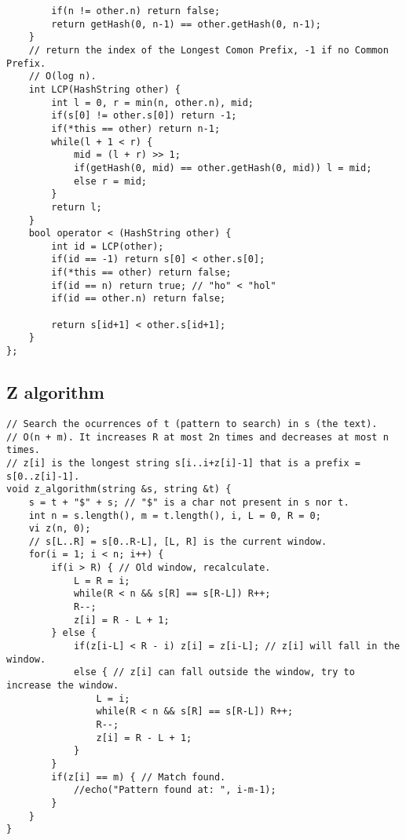 \documentclass[a4paper]{article}
\begin{document}
\begin{multicols}{2}
\begin{verbatim}
        if(n != other.n) return false;
        return getHash(0, n-1) == other.getHash(0, n-1);
    }
    // return the index of the Longest Comon Prefix, -1 if no Common Prefix.
    // O(log n).
    int LCP(HashString other) {
        int l = 0, r = min(n, other.n), mid;
        if(s[0] != other.s[0]) return -1;
        if(*this == other) return n-1;
        while(l + 1 < r) {
            mid = (l + r) >> 1;
            if(getHash(0, mid) == other.getHash(0, mid)) l = mid;
            else r = mid;
        }
        return l;
    }
    bool operator < (HashString other) {
        int id = LCP(other);
        if(id == -1) return s[0] < other.s[0];
        if(*this == other) return false;
        if(id == n) return true; // "ho" < "hol"
        if(id == other.n) return false;

        return s[id+1] < other.s[id+1];
    }
};
\end{verbatim}
\end{multicols}
\subsection*{Z algorithm}
\begin{verbatim}
// Search the ocurrences of t (pattern to search) in s (the text).
// O(n + m). It increases R at most 2n times and decreases at most n times. 
// z[i] is the longest string s[i..i+z[i]-1] that is a prefix = s[0..z[i]-1].
void z_algorithm(string &s, string &t) {
    s = t + "$" + s; // "$" is a char not present in s nor t.
    int n = s.length(), m = t.length(), i, L = 0, R = 0;
    vi z(n, 0);
    // s[L..R] = s[0..R-L], [L, R] is the current window.
    for(i = 1; i < n; i++) {
        if(i > R) { // Old window, recalculate.
            L = R = i;
            while(R < n && s[R] == s[R-L]) R++;
            R--;
            z[i] = R - L + 1;
        } else {
            if(z[i-L] < R - i) z[i] = z[i-L]; // z[i] will fall in the window.
            else { // z[i] can fall outside the window, try to increase the window.
                L = i;
                while(R < n && s[R] == s[R-L]) R++;
                R--;
                z[i] = R - L + 1;
            }
        }
        if(z[i] == m) { // Match found.
            //echo("Pattern found at: ", i-m-1);
        }
    }
}
\end{verbatim}
\end{document}
